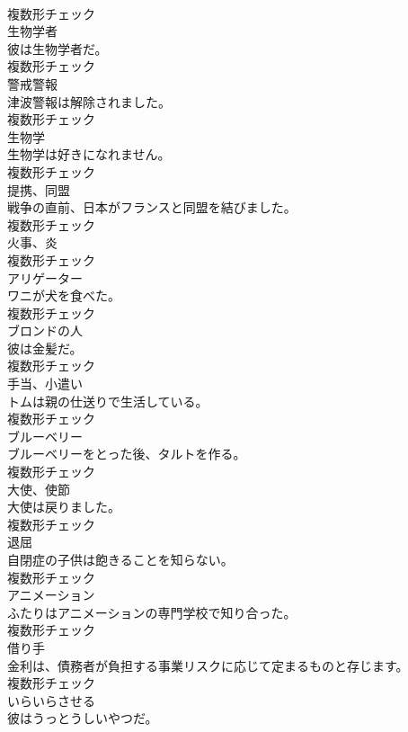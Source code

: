 \documentclass[8pt]{extreport}
\begin{document}
\begin{CJK}{UTF8}{min}
\\	複数形チェック
\\	[名詞]	生物学者	
\\	彼は生物学者だ。	
\\	複数形チェック
\\	[名詞]	警戒警報	
\\	津波警報は解除されました。	
\\	複数形チェック
\\	[名詞]	生物学	
\\	生物学は好きになれません。	
\\	複数形チェック
\\	[名詞]	提携、同盟	
\\	戦争の直前、日本がフランスと同盟を結びました。	
\\	複数形チェック
\\	[名詞]	火事、炎	
\\	複数形チェック
\\	[名詞]	アリゲーター	
\\	ワニが犬を食べた。	
\\	複数形チェック
\\	[名詞]	ブロンドの人	
\\	彼は金髪だ。	
\\	複数形チェック
\\	[名詞]	手当、小遣い	
\\	トムは親の仕送りで生活している。	
\\	複数形チェック
\\	[名詞]	ブルーベリー	
\\	ブルーベリーをとった後、タルトを作る。	
\\	複数形チェック
\\	[名詞]	大使、使節	
\\	大使は戻りました。	
\\	複数形チェック
\\	[名詞]	退屈	
\\	自閉症の子供は飽きることを知らない。	
\\	複数形チェック
\\	[名詞]	アニメーション	
\\	ふたりはアニメーションの専門学校で知り合った。	
\\	複数形チェック
\\	[名詞]	借り手	
\\	金利は、債務者が負担する事業リスクに応じて定まるものと存じます。	
\\	複数形チェック
\\	[動詞]	いらいらさせる	
\\	彼はうっとうしいやつだ。	

\end{CJK}
\end{document}
